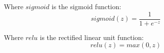 \documentclass[12pt]{article}
\begin{document}
\begin{enumerate}
\begin{enumerate}
                        Where $sigmoid$ is the sigmoid function:
                        \begin{equation}
                              sigmoid(z) = \frac{1}{1+e^{-z}}
                        \end{equation}

                        Where $relu$ is the rectified linear unit function:
                        \begin{equation}
                              relu(z) = max(0, z)
                        \end{equation}
            \end{enumerate}
\end{enumerate}
\end{document}

